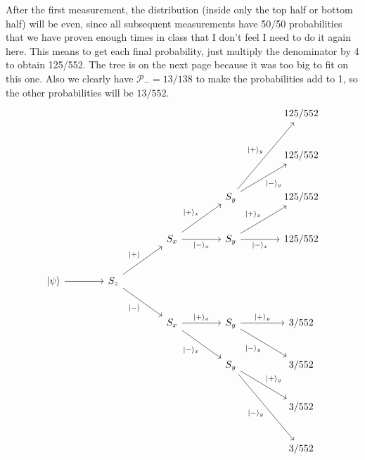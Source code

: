 \documentclass[11pt, letterpaper]{article}
\begin{document}
\begin{enumerate}
		After the first measurement, the distribution (inside only the top half or bottom half) will be even, since all subsequent measurements have 50/50 probabilities that we have proven enough times in class that I don't feel I need to do it again here. This means to get each final probability, just multiply the denominator by 4 to obtain 125/552. The tree is on the next page because it was too big to fit on this one. Also we clearly have $\mathcal{P}_-=13/138$ to make the probabilities add to 1, so the other probabilities will be $13/552$.\newpage
		\[\begin{tikzcd}[row sep = 2.5em, column sep = 4em]
			&&&&125/552\\
			&&&&125/552\\
			&&&S_y\arrow[ru, "\ket{-}_y"']\arrow[ruu, "\ket{+}_y"]&125/552\\
			&&S_x\arrow[ru, "\ket{+}_x"]\arrow[r, "\ket{-}_x"']&S_y\arrow[ru, "\ket{+}_x"]\arrow[r, "\ket{-}_x"']&125/552\\
			\ket{\psi }\arrow[r]&S_z\arrow[ru, "\ket{+}"]\arrow[dr, "\ket{-} "'] \\
					    &&S_x\arrow[dr, "\ket{-}_x"']\arrow[r, "\ket{+}_x"]&S_y\arrow[dr, "\ket{-}_y"']\arrow[r, "\ket{+}_y"]&3/552\\
				   &&&S_y\arrow[ddr, "\ket{-}_y"']\arrow[dr, "\ket{+}_y"]&3/552\\
				   &&&&3/552\\
				   &&&&3/552
		\end{tikzcd}\]
\end{enumerate}
\end{document}
